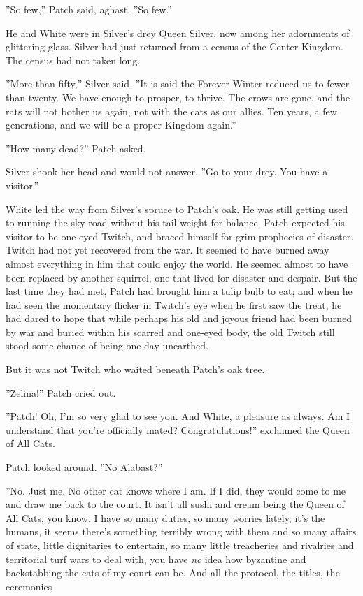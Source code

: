 \documentclass[12pt]{book}
\begin{document}
 ''So few,'' Patch said, aghast. ''So few.''\par
 He and White were in Silver's drey %
 Queen Silver, now %
 among her adornments of glittering glass. Silver had just returned from a census of the Center Kingdom. The census had not taken long.\par
 ''More than fifty,'' Silver said. ''It is said the Forever Winter reduced us to fewer than twenty. We have enough to prosper, to thrive. The crows are gone, and the rats will not bother us again, not with the cats as our allies. Ten years, a few generations, and we will be a proper Kingdom again.''\par
 ''How many dead?'' Patch asked.\par
 Silver shook her head and would not answer. ''Go to your drey. You have a visitor.''\par
 White led the way from Silver's spruce to Patch's oak. He was still getting used to running the sky-road without his tail-weight for balance. Patch expected his visitor to be one-eyed Twitch, and braced himself for grim prophecies of disaster. Twitch had not yet recovered from the war. It seemed to have burned away almost everything in him that could enjoy the world. He seemed almost to have been replaced by another squirrel, one that lived for disaster and despair. But the last time they had met, Patch had brought him a tulip bulb to eat; and when he had seen the momentary flicker in Twitch's eye when he first saw the treat, he had dared to hope that while perhaps his old and joyous friend had been burned by war and buried within his scarred and one-eyed body, the old Twitch still stood some chance of being one day unearthed.\par
 But it was not Twitch who waited beneath Patch's oak tree.\par
 ''Zelina!'' Patch cried out.\par
 ''Patch! Oh, I'm so very glad to see you. And White, a pleasure as always. Am I understand that you're officially mated? Congratulations!'' exclaimed the Queen of All Cats.\par
 Patch looked around. ''No Alabast?''\par
 ''No. Just me. No other cat knows where I am. If I did, they would come to me and draw me back to the court. It isn't all sushi and cream being the Queen of All Cats, you know. I have so many duties, so many worries %
 lately, it's the humans, it seems there's something terribly wrong with them %
 and so many affairs of state, little dignitaries to entertain, so many little treacheries and rivalries and territorial turf wars to deal with, you have {\it no} idea how byzantine and backstabbing the cats of my court can be. And all the protocol, the titles, the ceremonies %
\end{document}

